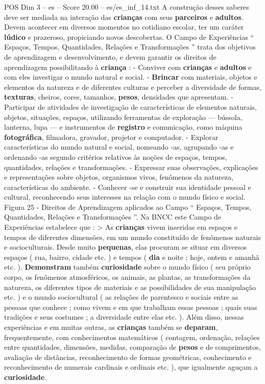 \begin{textsample}{POS Dim 3 – es – Score 20.00 – es/es\_inf\_14.txt}
A construção desses saberes deve ser mediada na interação das \textbf{crianças} com seus \textbf{parceiros} e \textbf{adultos}.
Devem acontecer em diversos momentos no cotidiano escolar, ter um caráter \textbf{lúdico} e prazeroso, propiciando novos descobertas.
O Campo de Experiências “ Espaços, Tempos, Quantidades, Relações e Transformações ” trata dos objetivos de aprendizagem e desenvolvimento, e devem garantir os direitos de aprendizagem possibilitando à \textbf{criança} : - Conviver com \textbf{crianças} e \textbf{adultos} e com eles investigar o mundo natural e social. - \textbf{Brincar} com materiais, objetos e elementos da natureza e de diferentes culturas e perceber a diversidade de formas, \textbf{texturas}, cheiros, cores, tamanhos, \textbf{pesos}, densidades que apresentam. - Participar de atividades de investigação de características de elementos naturais, objetos, situações, espaços, utilizando ferramentas de exploração — bússola, lanterna, lupa — e instrumentos de \textbf{registro} e comunicação, como máquina \textbf{fotográfica}, filmadora, gravador, projetor e computador. - Explorar características do mundo natural e social, nomeando -as, agrupando -as e ordenando -as segundo critérios relativos às noções de espaços, tempos, quantidades, relações e transformações. - Expressar suas observações, explicações e representações sobre objetos, organismos vivos, fenômenos da natureza, características do ambiente. - Conhecer -se e construir sua identidade pessoal e cultural, reconhecendo seus interesses na relação com o mundo físico e social.
Figura 25 - Direitos de Aprendizagem aplicados ao Campo “ Espaços, Tempos, Quantidades, Relações e Transformações ”.
Na BNCC este Campo de Experiências estabelece que : > As \textbf{crianças} vivem inseridas em espaços e tempos de diferentes dimensões, em um mundo constituído de fenômenos naturais e socioculturais.
Desde muito \textbf{pequenas}, elas procuram se situar em diversos espaços ( rua, bairro, cidade etc. ) e tempos ( \textbf{dia} e noite ; hoje, ontem e amanhã etc. ). \textbf{Demonstram} também \textbf{curiosidade} sobre o mundo físico ( seu próprio corpo, os fenômenos atmosféricos, os animais, as plantas, as transformações da natureza, os diferentes tipos de materiais e as possibilidades de sua manipulação etc. ) e o mundo sociocultural ( as relações de parentesco e sociais entre as pessoas que conhece ; como vivem e em que trabalham essas pessoas ; quais suas tradições e seus costumes ; a diversidade entre elas etc. ).
Além disso, nessas experiências e em muitas outras, as \textbf{crianças} também se \textbf{deparam}, frequentemente, com conhecimentos matemáticos ( contagem, ordenação, relações entre quantidades, dimensões, medidas, comparação de \textbf{pesos} e de comprimentos, avaliação de distâncias, reconhecimento de formas geométricas, conhecimento e reconhecimento de numerais cardinais e ordinais etc. ), que igualmente aguçam a \textbf{curiosidade}.

\end{textsample}
